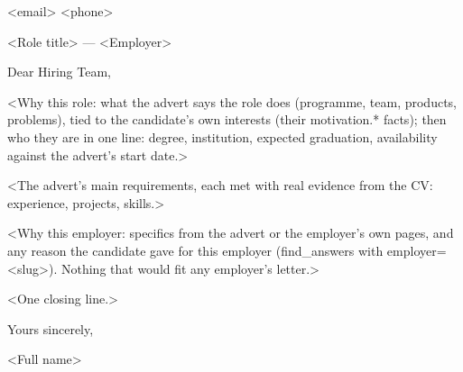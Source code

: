 \documentclass[11pt,a4paper]{article}
\begin{document}
{\large\bfseries <Full name>}\par
<email> \quad <phone>\par
<Role title> --- <Employer>

Dear Hiring Team,

<Why this role: what the advert says the role does (programme, team, products, problems), tied to the candidate's own interests (their motivation.* facts); then who they are in one line: degree, institution, expected graduation, availability against the advert's start date.>

<The advert's main requirements, each met with real evidence from the CV: experience, projects, skills.>

<Why this employer: specifics from the advert or the employer's own pages, and any reason the candidate gave for this employer (find_answers with employer=<slug>). Nothing that would fit any employer's letter.>

<One closing line.>

Yours sincerely,

<Full name>
\end{document}
